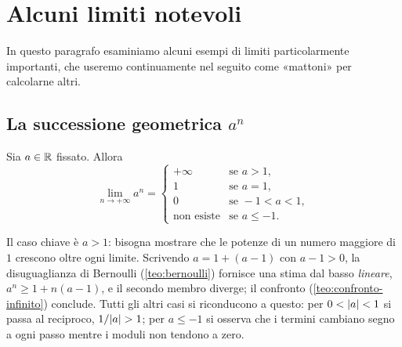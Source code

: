 \section{Alcuni limiti notevoli}
\label{sec:limiti-notevoli}

In questo paragrafo esaminiamo alcuni esempi di limiti particolarmente importanti, che
useremo continuamente nel seguito come «mattoni» per calcolarne altri.

\subsection{La successione geometrica $a^{n}$}

\begin{teorema}\label{teo:lim-geometrica}
Sia $a\in\mathbb{R}$ fissato. Allora
\begin{equation}\label{eq:lim-an}
  \lim_{n\to+\infty}a^{n}=
  \begin{cases}
    +\infty & \text{se } a>1,\\
    1 & \text{se } a=1,\\
    0 & \text{se } -1<a<1,\\
    \text{non esiste} & \text{se } a\le-1 .
  \end{cases}
\end{equation}
\end{teorema}

\begin{schema}
\end{schema}

\begin{strategia}
Il caso chiave è $a>1$: bisogna mostrare che le potenze di un numero maggiore di $1$
crescono oltre ogni limite. Scrivendo $a=1+(a-1)$ con $a-1>0$, la disuguaglianza di
Bernoulli (\cref{teo:bernoulli}) fornisce una stima dal basso \emph{lineare},
$a^{n}\ge1+n(a-1)$, e il secondo membro diverge; il confronto (\cref{teo:confronto-infinito})
conclude. Tutti gli altri casi si riconducono a questo: per $0<\lvert a\rvert<1$ si passa al
reciproco, $1/\lvert a\rvert>1$; per $a\le-1$ si osserva che i termini cambiano segno a ogni
passo mentre i moduli non tendono a zero.
\end{strategia}

